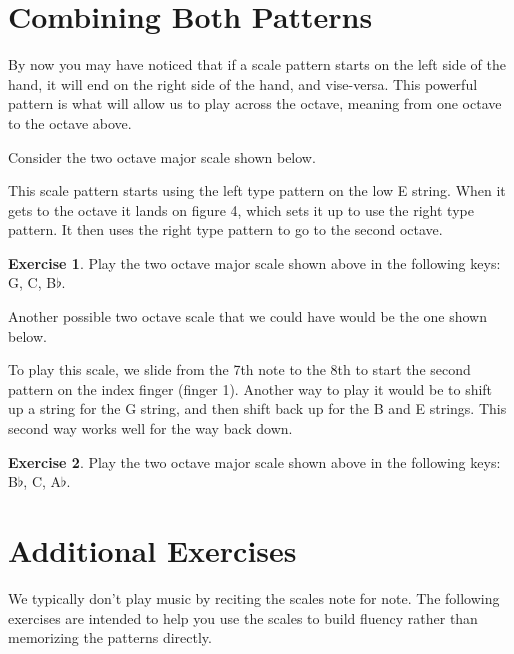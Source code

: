 \documentclass[12pt]{article}
\theoremstyle{definition}
\newtheorem{exercise}{Exercise}
\begin{document}
\section{Combining Both Patterns}
By now you may have noticed that if a scale pattern starts on the left side of the hand, it will end on the right side of the hand, and vise-versa. This powerful pattern is what will allow us to play across the octave, meaning from one octave to the octave above. 

Consider the two octave major scale shown below. 


This scale pattern starts using the left type pattern on the low E string. When it gets to the octave it lands on figure 4, which sets it up to use the right type pattern. It then uses the right type pattern to go to the second octave. 

\begin{exercise}
Play the two octave major scale shown above in the following keys: G, C, B$\flat$. 
\end{exercise}

Another possible two octave scale that we could have would be the one shown below. 


To play this scale, we slide from the 7th note to the 8th to start the second pattern on the index finger (finger 1). Another way to play it would be to shift up a string for the G string, and then shift back up for the B and E strings. This second way works well for the way back down. 

\begin{exercise}
Play the two octave major scale shown above in the following keys: B$\flat$, C, A$\flat$. 
\end{exercise}

\section{Additional Exercises}

We typically don't play music by reciting the scales note for note. The following exercises are intended to help you use the scales to build fluency rather than memorizing the patterns directly. 
\end{document}
